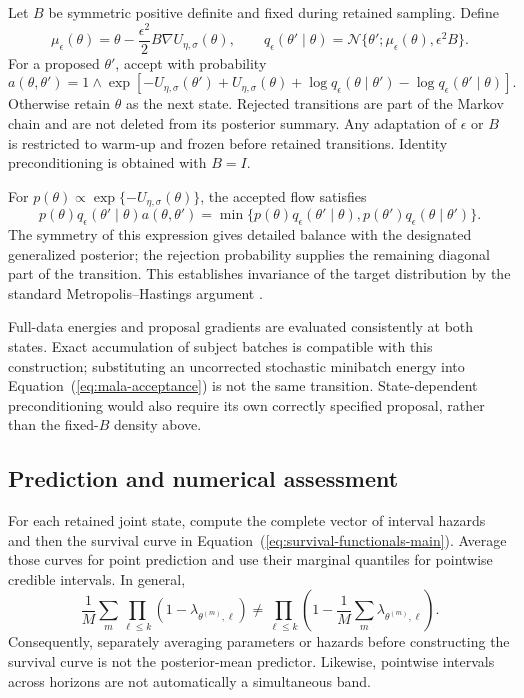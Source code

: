 \documentclass{article} %
\renewcommand{\eqref}[1]{\textup{(\ref{#1})}}
\begin{document}
Let $B$ be symmetric positive definite and fixed during retained sampling. Define
\begin{equation}
\mu_\epsilon(\theta)
=\theta-\frac{\epsilon^2}{2}B\nabla U_{\eta,\sigma}(\theta),
\qquad
q_\epsilon(\theta'\mid\theta)
=\mathcal N\{\theta';\mu_\epsilon(\theta),\epsilon^2 B\}.
\label{eq:mala-kernel}
\end{equation}
For a proposed $\theta'$, accept with probability
\begin{equation}
a(\theta,\theta')=
1\wedge\exp\!\left[
-U_{\eta,\sigma}(\theta')+U_{\eta,\sigma}(\theta)
+\log q_\epsilon(\theta\mid\theta')
-\log q_\epsilon(\theta'\mid\theta)
\right].
\label{eq:mala-acceptance}
\end{equation}
Otherwise retain $\theta$ as the next state. Rejected transitions are part of the Markov chain and are not deleted from its posterior summary. Any adaptation of $\epsilon$ or $B$ is restricted to warm-up and frozen before retained transitions. Identity preconditioning is obtained with $B=I$.

For $p(\theta)\propto\exp\{-U_{\eta,\sigma}(\theta)\}$, the accepted flow satisfies
\[
p(\theta)q_\epsilon(\theta'\mid\theta)a(\theta,\theta')
=\min\{p(\theta)q_\epsilon(\theta'\mid\theta),
       p(\theta')q_\epsilon(\theta\mid\theta')\}.
\]
The symmetry of this expression gives detailed balance with the designated generalized posterior; the rejection probability supplies the remaining diagonal part of the transition. This establishes invariance of the target distribution by the standard Metropolis--Hastings argument \citep{roberts1998}.

Full-data energies and proposal gradients are evaluated consistently at both states. Exact accumulation of subject batches is compatible with this construction; substituting an uncorrected stochastic minibatch energy into Equation~\eqref{eq:mala-acceptance} is not the same transition. State-dependent preconditioning would also require its own correctly specified proposal, rather than the fixed-$B$ density above.

\subsection{Prediction and numerical assessment}

For each retained joint state, compute the complete vector of interval hazards and then the survival curve in Equation~\eqref{eq:survival-functionals-main}. Average those curves for point prediction and use their marginal quantiles for pointwise credible intervals. In general,
\[
\frac1M\sum_m\prod_{\ell\le k}(1-\lambda_{\theta^{(m)},\ell})
\ne
\prod_{\ell\le k}\left(1-\frac1M\sum_m\lambda_{\theta^{(m)},\ell}\right).
\]
Consequently, separately averaging parameters or hazards before constructing the survival curve is not the posterior-mean predictor. Likewise, pointwise intervals across horizons are not automatically a simultaneous band.
\end{document}
